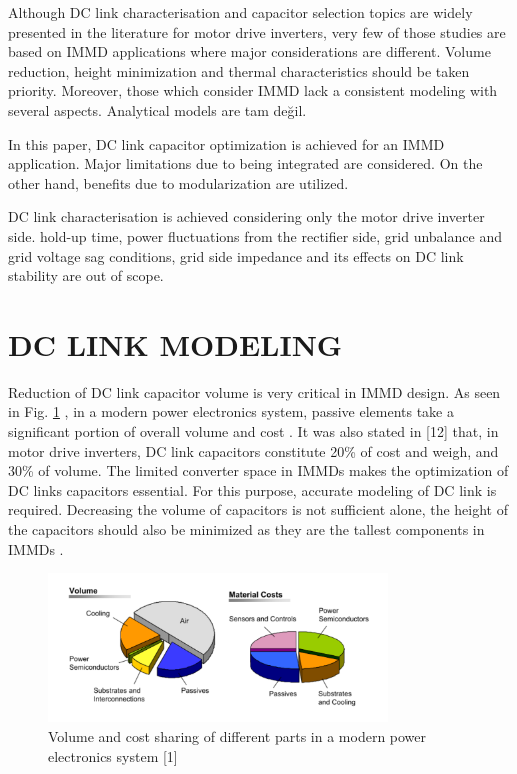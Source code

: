\documentclass[conference,a4paper,twocolumn]{IEEEtran}
\begin{document}
Although DC link characterisation and capacitor selection topics are widely presented in the literature for motor drive inverters, very few of those studies are based on IMMD applications where major considerations are different. Volume reduction, height minimization and thermal characteristics should be taken priority. Moreover, those which consider IMMD lack a consistent modeling with several aspects. Analytical models are tam değil.

In this paper, DC link capacitor optimization is achieved for an IMMD application. Major limitations due to being integrated are considered. On the other hand, benefits due to modularization are utilized.

DC link characterisation is achieved considering only the motor drive inverter side. hold-up time, power fluctuations from the rectifier side, grid unbalance and grid voltage sag conditions, grid side impedance and its effects on DC link stability are out of scope.


\section{DC LINK MODELING}


Reduction of DC link capacitor volume is very critical in IMMD design. As seen in Fig. \ref{fig2} , in a modern power electronics system, passive elements take a significant portion of overall volume and cost \cite{LoCalzo2016}. It was also stated in [12] that, in motor drive inverters, DC link capacitors constitute 20\% of cost and weigh, and 30\% of volume. The limited converter space in IMMDs makes the optimization of DC links capacitors essential. For this purpose, accurate modeling of DC link is required. Decreasing the volume of capacitors is not sufficient alone, the height of the capacitors should also be minimized as they are the tallest components in IMMDs \cite{Wang2013,Wang2015b}.

\begin{figure}[h]
  \centering
  \includegraphics[width=9cm]{fig2}
  \caption{Volume and cost sharing of different parts in a modern power electronics system [1]}
  \label{fig2}
\end{figure}
\end{document}
